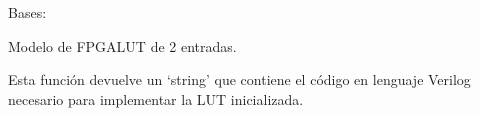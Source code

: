 \documentclass[letterpaper,10pt,english]{sphinxmanual}
\begin{document}

\begin{fulllineitems}
\label{\detokenize{myfpga:myfpga.Lut2}}
\pysigstartsignatures
{}
\pysigstopsignatures
\sphinxAtStartPar
Bases: 

\sphinxAtStartPar
Modelo de FPGA\sphinxhyphen{}LUT de 2 entradas.

\begin{fulllineitems}
\label{\detokenize{myfpga:myfpga.Lut2.impl}}
\pysigstartsignatures
{}
\pysigstopsignatures
\sphinxAtStartPar
Esta función devuelve un ‘string’ que contiene el código en lenguaje 
Verilog necesario para implementar la LUT inicializada.

\end{fulllineitems}


\end{fulllineitems}

\end{document}
